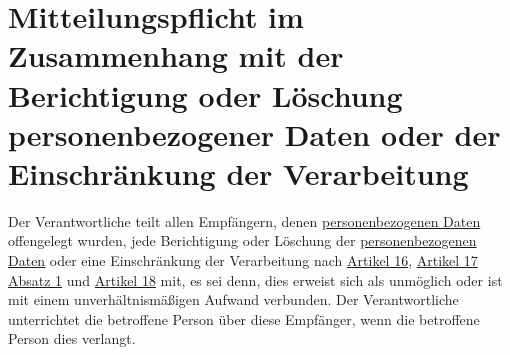 \chapter{Mitteilungspflicht im Zusammenhang mit der Berichtigung oder Löschung personenbezogener Daten oder der
 Einschränkung der Verarbeitung}
\label{ch:19}


Der Verantwortliche teilt allen Empfängern, denen \hyperref[itm:04-1]{personenbezogenen Daten} offengelegt wurden, jede Berichtigung oder
Löschung der \hyperref[itm:04-1]{personenbezogenen Daten} oder eine Einschränkung der Verarbeitung nach \hyperref[ch:16]{Artikel 16},
\hyperref[itm:17-1]{Artikel 17 Absatz 1} und \hyperref[ch:18]{Artikel 18} mit, es sei denn, dies erweist sich als
unmöglich oder ist mit einem unverhältnismäßigen Aufwand verbunden. Der Verantwortliche unterrichtet die betroffene
Person über diese Empfänger, wenn die betroffene Person dies verlangt.


